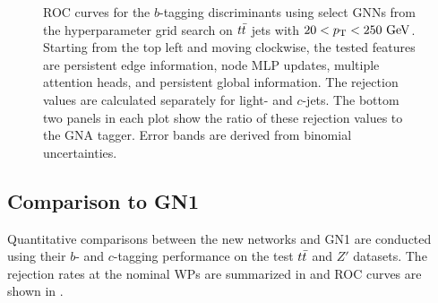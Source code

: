 \begin{figure}[ht]
    \caption{ROC curves for the $b$-tagging discriminants using select GNNs from the hyperparameter grid search on $t\bar{t}$ jets with $20 < \pt < 250~\GeV$.
        Starting from the top left and moving clockwise, the tested features are persistent edge information, node MLP updates, multiple attention heads, and persistent global information. The rejection values are calculated separately for light- and $c$-jets. The bottom two panels in each plot show the ratio of these rejection values to the GNA tagger. Error bands are derived from binomial uncertainties.}
    \label{fig:ablation}
\end{figure}

\FloatBarrier

\subsection{Comparison to GN1}

Quantitative comparisons between the new networks and GN1 are conducted using their $b$- and $c$-tagging performance on the test $t\bar{t}$ and $Z'$ datasets.
The rejection rates at the nominal WPs are summarized in  and ROC curves are shown in .

